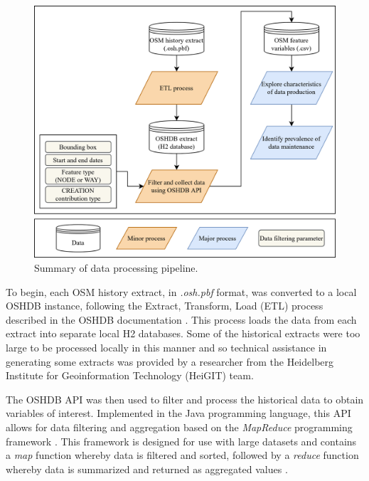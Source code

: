 \begin{figure} %
    \centering %
    \includegraphics[width = \textwidth]{Images/Datapipeline.png} %
    \caption{Summary of data processing pipeline.} %
    \label{fig:pipe} %
\end{figure}

To begin, each OSM history extract, in \textit{.osh.pbf} format, was converted to a local OSHDB instance, following the Extract, Transform, Load (ETL) process described in the OSHDB documentation \parencite{heidelberg_institute_for_geoinformation_technology_setup_2020}. This process loads the data from each extract into separate local H2 databases. Some of the historical extracts were too large to be processed locally in this manner and so technical assistance in generating some extracts was provided by a researcher from the Heidelberg Institute for Geoinformation Technology (HeiGIT) team. 

The OSHDB API \parencite{raifer_oshdb_2019} was then used to filter and process the historical data to obtain variables of interest.  Implemented in the Java programming language, this API allows for data filtering and aggregation based on the \textit{MapReduce} programming framework \parencite{raifer_oshdb_2019}. This framework is designed for use with large datasets and contains a \textit{map} function whereby data is filtered and sorted, followed by a \textit{reduce} function whereby data is summarized and returned as aggregated values \parencite{dean_mapreduce_2008}.


